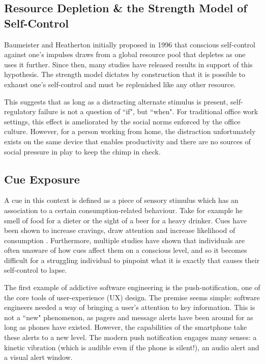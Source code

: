 \subsection{Resource Depletion \& the Strength Model of Self-Control}
Baumeister and Heatherton \cite{baumeister1996self} initially proposed in 1996 that conscious self-control against one's impulses draws from a global resource pool that depletes as one uses it further. Since then, many studies have released results in support of this hypothesis. The strength model dictates by construction that it is possible to exhaust one's self-control and must be replenished like any other resource.

This suggests that as long as a distracting alternate stimulus is present, self-regulatory failure is not a question of ``if", but ``when". For traditional office work settings, this effect is ameliorated by the social norms enforced by the office culture. However, for a person working from home, the distraction unfortunately exists on the same device that enables productivity and there are no sources of social pressure in play to keep the chimp in check.

\subsection{Cue Exposure}
A cue in this context is defined as a piece of sensory stimulus which has an association to a certain consumption-related behaviour. Take for example he smell of food for a dieter or the sight of a beer for a heavy drinker. Cues have been shown to increase cravings, draw attention and increase likelihood of consumption \cite{jansen1998learning}. Furthermore, multiple studies \cite{stacy2010implicit} have shown that individuals are often unaware of how cues affect them on a conscious level, and so it becomes difficult for a struggling individual to pinpoint what it is exactly that causes their self-control to lapse.

The first example of addictive software engineering is the push-notification, one of the core tools of user-experience (UX) design. The premise seems simple: software engineers needed a way of bringing a user's attention to key information. This is not a ``new" phenomenon, as pagers and message alerts have been around for as long as phones have existed. However, the capabilities of the smartphone take these alerts to a new level. The modern push notification engages many senses: a kinetic vibration (which is audible even if the phone is silent!), an audio alert and a visual alert window.


